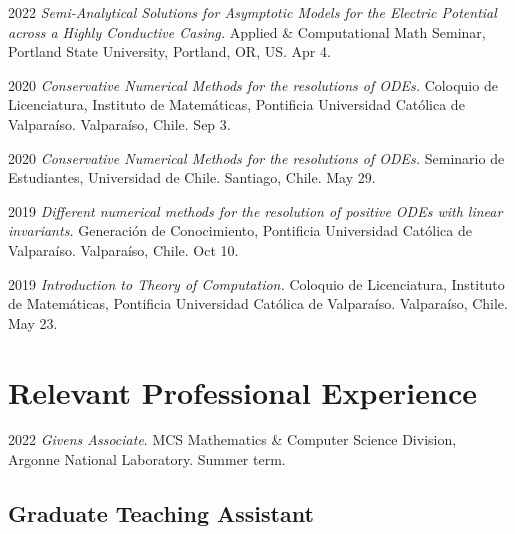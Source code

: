 \documentclass[12pt,letterpaper]{report}
\begin{document}
    \begin{tablist}

	\item[2022] \tab \emph{Semi-Analytical Solutions for Asymptotic Models for the Electric Potential across a Highly Conductive Casing.} Applied \& Computational Math Seminar, Portland State University, Portland, OR, US. Apr 4.

        \item[2020] \tab \emph{Conservative Numerical Methods for the resolutions of ODEs.} Coloquio de Licenciatura, Instituto de Matem\'aticas, Pontificia Universidad Cat\'olica de Valpara\'iso. Valpara\'iso, Chile. Sep 3.
         
        \item[2020] \tab \emph{Conservative Numerical Methods for the resolutions of ODEs.} Seminario de Estudiantes, Universidad de Chile. Santiago, Chile. May 29.

    	\item[2019] \tab \emph{Different numerical methods for the resolution of positive ODEs with linear invariants.} Generaci\'on de Conocimiento, Pontificia Universidad Cat\'olica de Valpara\'iso. Valpara\'iso, Chile. Oct 10.
    
    	\item[2019] \tab \emph{Introduction to Theory of Computation.} Coloquio de Licenciatura, Instituto de Matem\'aticas, Pontificia Universidad Cat\'olica de Valpara\'iso. Valpara\'iso, Chile. May 23.
    	
    \end{tablist}



    \section*{Relevant Professional Experience}

	\begin{tablist}

        \item[2022] \tab \emph{Givens Associate}. MCS Mathematics \& Computer Science Division, Argonne National Laboratory. Summer term.

	\end{tablist}


    \subsection*{Graduate Teaching Assistant}
\end{document}
